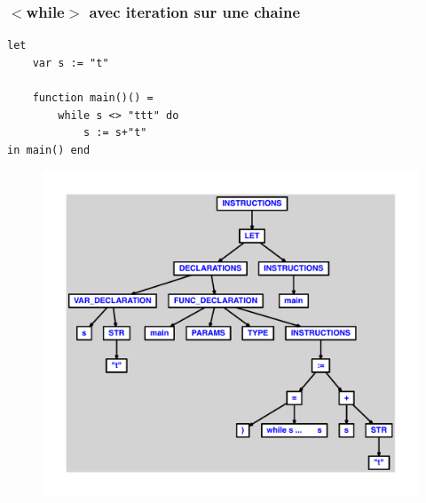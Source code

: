 \documentclass{article}
\begin{document}
\subsubsection{$ < $while$ > $ avec iteration sur une chaine}
\begin{lstlisting}
let
	var s := "t"

	function main()() =
		while s <> "ttt" do
			s := s+"t"
in main() end
\end{lstlisting}
\newpage
\begin{figure}[H]
\centering
\includegraphics[max width=\textwidth]{ast/ast_340.pdf}
\end{figure}
\newpage
\end{document}
